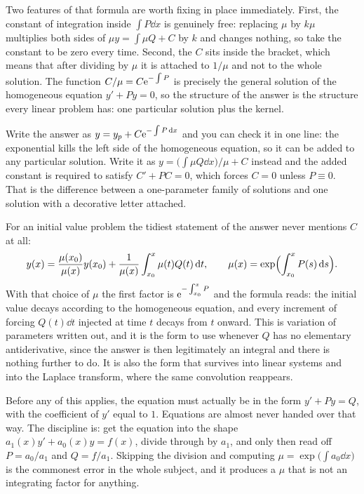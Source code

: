 Two features of that formula are worth fixing in place immediately. First, the constant of integration inside $\int P\dd x$ is genuinely free: replacing $\mu$ by $k\mu$ multiplies both sides of $\mu y=\int\mu Q+C$ by $k$ and changes nothing, so take the constant to be zero every time. Second, the $C$ sits inside the bracket, which means that after dividing by $\mu$ it is attached to $1/\mu$ and not to the whole solution. The function $C/\mu=C\mathrm{e}^{-\int P}$ is precisely the general solution of the homogeneous equation $y'+Py=0$, so the structure of the answer is the structure every linear problem has: one particular solution plus the kernel.

\begin{keynote}
Write the answer as $y=y_p+C\mathrm{e}^{-\int P\,\mathrm{d} x}$ and you can check it in one line: the exponential kills the left side of the homogeneous equation, so it can be added to any particular solution. Write it as $y=\bigl(\int\mu Q\dd x\bigr)/\mu+C$ instead and the added constant is required to satisfy $C'+PC=0$, which forces $C=0$ unless $P\equiv0$. That is the difference between a one-parameter family of solutions and one solution with a decorative letter attached.
\end{keynote}

\begin{keynote}
For an initial value problem the tidiest statement of the answer never mentions $C$ at all:
\[y(x)=\frac{\mu(x_0)}{\mu(x)}y(x_0)+\frac{1}{\mu(x)}\int_{x_0}^{x}\mu(t)Q(t)\,\mathrm{d} t,\qquad \mu(x)=\exp\Bigl(\int_{x_0}^{x}P(s)\,\mathrm{d} s\Bigr).\]
With that choice of $\mu$ the first factor is $\mathrm{e}^{-\int_{x_0}^{x}P}$ and the formula reads: the initial value decays according to the homogeneous equation, and every increment of forcing $Q(t)\dd t$ injected at time $t$ decays from $t$ onward. This is variation of parameters written out, and it is the form to use whenever $Q$ has no elementary antiderivative, since the answer is then legitimately an integral and there is nothing further to do. It is also the form that survives into linear systems and into the Laplace transform, where the same convolution reappears.
\end{keynote}

Before any of this applies, the equation must actually be in the form $y'+Py=Q$, with the coefficient of $y'$ equal to $1$. Equations are almost never handed over that way. The discipline is: get the equation into the shape $a_1(x)y'+a_0(x)y=f(x)$, divide through by $a_1$, and only then read off $P=a_0/a_1$ and $Q=f/a_1$. Skipping the division and computing $\mu=\exp\bigl(\int a_0\dd x\bigr)$ is the commonest error in the whole subject, and it produces a $\mu$ that is not an integrating factor for anything.

